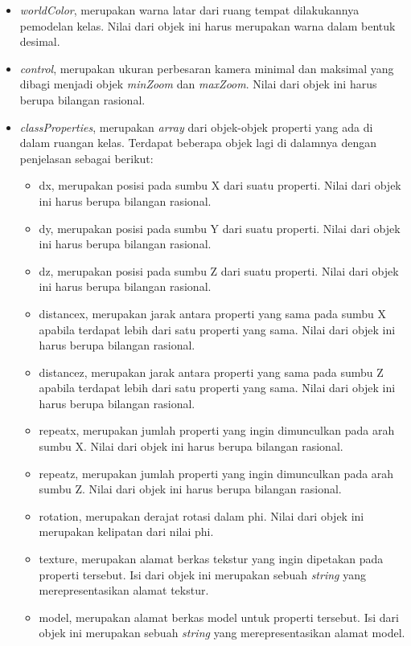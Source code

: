 \begin{itemize}
	\item {\it worldColor}, merupakan warna latar dari ruang tempat dilakukannya pemodelan kelas. Nilai dari objek ini harus merupakan warna dalam bentuk desimal.
	\item {\it control}, merupakan ukuran perbesaran kamera minimal dan maksimal yang dibagi menjadi objek {\it minZoom} dan {\it maxZoom}. Nilai dari objek ini harus berupa bilangan rasional.
	\item {\it classProperties}, merupakan {\it array} dari objek-objek properti yang ada di dalam ruangan kelas. Terdapat beberapa objek lagi di dalamnya dengan penjelasan sebagai berikut:
	\begin{itemize}
		\item dx, merupakan posisi pada sumbu X dari suatu properti. Nilai dari objek ini harus berupa bilangan rasional.
		\item dy, merupakan posisi pada sumbu Y dari suatu properti. Nilai dari objek ini harus berupa bilangan rasional.
		\item dz, merupakan posisi pada sumbu Z dari suatu properti. Nilai dari objek ini harus berupa bilangan rasional.
		\item distancex, merupakan jarak antara properti yang sama pada sumbu X apabila terdapat lebih dari satu properti yang sama. Nilai dari objek ini harus berupa bilangan rasional.
		\item distancez, merupakan jarak antara properti yang sama pada sumbu Z apabila terdapat lebih dari satu properti yang sama. Nilai dari objek ini harus berupa bilangan rasional. 
		\item repeatx, merupakan jumlah properti yang ingin dimunculkan pada arah sumbu X. Nilai dari objek ini harus berupa bilangan rasional.
		\item repeatz, merupakan jumlah properti yang ingin dimunculkan pada arah sumbu Z. Nilai dari objek ini harus berupa bilangan rasional.
		\item rotation, merupakan derajat rotasi dalam phi. Nilai dari objek ini merupakan kelipatan dari nilai phi.
		\item texture, merupakan alamat berkas tekstur yang ingin dipetakan pada properti tersebut. Isi dari objek ini merupakan sebuah {\it string} yang merepresentasikan alamat tekstur. 
		\item model, merupakan alamat berkas model untuk properti tersebut. Isi dari objek ini merupakan sebuah {\it string} yang merepresentasikan alamat model.

\end{itemize}
\end{itemize}
